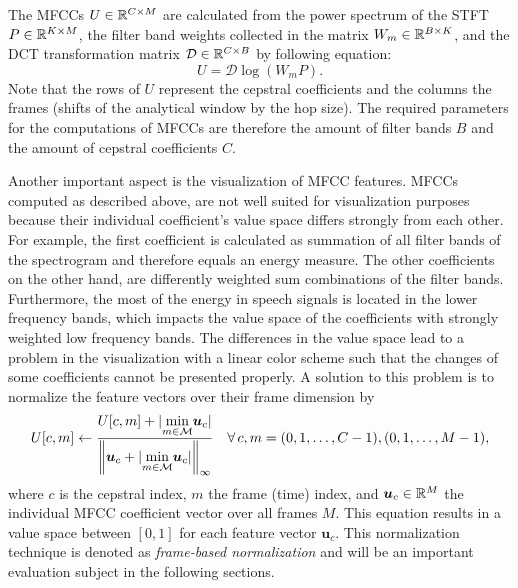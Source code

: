 \FloatBarrier
\noindent
The MFCCs $U \in \mathbb{R}^{C \times M}$ are calculated from the power spectrum of the STFT $P \in \mathbb{R}^{K \times M}$, the filter band weights collected in the matrix $W_m \in \mathbb{R}^{B \times K}$, and the DCT transformation matrix $\mathcal{D} \in \mathbb{R}^{C \times B}$ by following equation:
\begin{equation}\label{eq:signal_mfcc_mfcc}
  U = \mathcal{D} \log{ \left( W_m   P \right) }.
\end{equation}
Note that the rows of $U$ represent the cepstral coefficients and the columns the frames (shifts of the analytical window by the hop size).
The required parameters for the computations of MFCCs are therefore the amount of filter bands $B$ and the amount of cepstral coefficients $C$.

Another important aspect is the visualization of MFCC features.
MFCCs computed as described above, are not well suited for visualization purposes because their individual coefficient's value space differs strongly from each other.
For example, the first coefficient is calculated as summation of all filter bands of the spectrogram and therefore equals an energy measure.
The other coefficients on the other hand, are differently weighted sum combinations of the filter bands.
Furthermore, the most of the energy in speech signals is located in the lower frequency bands, which impacts the value space of the coefficients with strongly weighted low frequency bands.
The differences in the value space lead to a problem in the visualization with a linear color scheme such that the changes of some coefficients cannot be presented properly.
A solution to this problem is to normalize the feature vectors over their frame dimension by
\begin{equation}\label{eq:signal_mfcc_norm}
  U[c, m] \gets \frac{U[c, m] + \vert \underset{m \in \mathcal{M}}{\min} \bm{u}_c \vert}{\norm{\bm{u}_c + \vert \underset{m \in \mathcal{M}}{\min} \bm{u}_c \vert}_\infty} \quad \forall \, c, m = (0, 1, \dots, C - 1), (0, 1, \dots, M - 1),
\end{equation}
where $c$ is the cepstral index, $m$ the frame (time) index, and $\bm{u}_c \in \mathbb{R}^M$ the individual MFCC coefficient vector over all frames $M$.
This equation results in a value space between $[0, 1]$ for each feature vector $\bm{u}_c$.
This normalization technique is denoted as \emph{frame-based normalization} and will be an important evaluation subject in the following sections.

